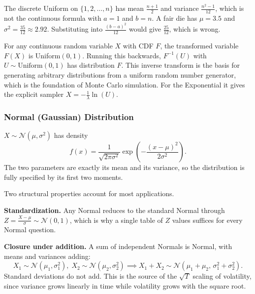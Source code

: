 \begin{keybox}
The discrete Uniform on $\{1, 2, \dots, n\}$ has mean $\frac{n+1}{2}$ and variance $\frac{n^2 - 1}{12}$, which is not the continuous formula with $a=1$ and $b=n$. A fair die has $\mu = 3.5$ and $\sigma^2 = \frac{35}{12} \approx 2.92$. Substituting into $\frac{(b-a)^2}{12}$ would give $\frac{25}{12}$, which is wrong.
\end{keybox}

\begin{keybox}
For any continuous random variable $X$ with CDF $F$, the transformed variable $F(X)$ is Uniform$(0,1)$. Running this backwards, $F^{-1}(U)$ with $U \sim \text{Uniform}(0,1)$ has distribution $F$. This inverse transform is the basis for generating arbitrary distributions from a uniform random number generator, which is the foundation of Monte Carlo simulation. For the Exponential it gives the explicit sampler $X = -\frac{1}{\lambda}\ln(U)$.
\end{keybox}

\subsubsection{Normal (Gaussian) Distribution}

\begin{definition}[Normal]
$X \sim \mathcal{N}(\mu, \sigma^2)$ has density
\[
f(x) = \frac{1}{\sqrt{2\pi\sigma^2}}\exp\!\left(-\frac{(x-\mu)^2}{2\sigma^2}\right).
\]
The two parameters are exactly its mean and its variance, so the distribution is fully specified by its first two moments.
\end{definition}

Two structural properties account for most applications.

\textbf{Standardization.} Any Normal reduces to the standard Normal through $Z = \frac{X - \mu}{\sigma} \sim \mathcal{N}(0,1)$, which is why a single table of $Z$ values suffices for every Normal question.

\textbf{Closure under addition.} A sum of independent Normals is Normal, with means and variances adding:
\[
X_1 \sim \mathcal{N}(\mu_1, \sigma_1^2), \; X_2 \sim \mathcal{N}(\mu_2, \sigma_2^2) \implies X_1 + X_2 \sim \mathcal{N}(\mu_1 + \mu_2, \, \sigma_1^2 + \sigma_2^2).
\]
Standard deviations do not add. This is the source of the $\sqrt{T}$ scaling of volatility, since variance grows linearly in time while volatility grows with the square root.

